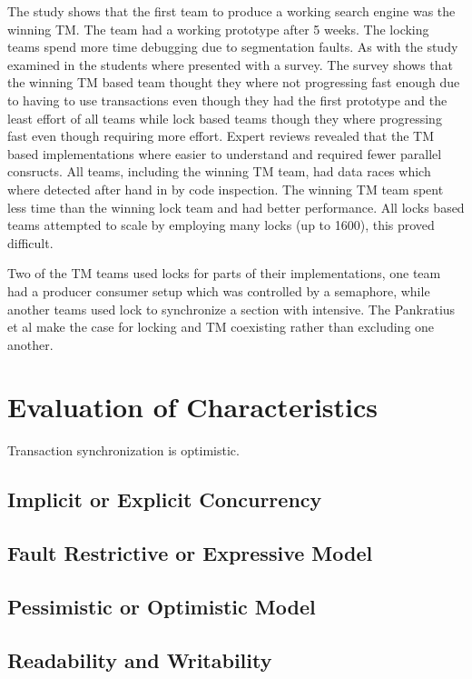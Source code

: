 The study shows that the first team to produce a working search engine was the winning \ac{TM}\cite[p. 6]{pankratius2009does}. The team had a working prototype after 5 weeks.   The locking teams spend more time debugging due to segmentation faults\cite[p. 6]{pankratius2009does}. As with the study examined in  the students where presented with a survey. The survey shows that the  winning \ac{TM} based team thought they where not progressing fast enough due to having to use transactions even though they had the first prototype and the least effort of all teams while lock based teams though they where progressing fast even though requiring more effort\cite[p. 6]{pankratius2009does}. Expert reviews revealed that the \ac{TM} based implementations where easier to understand and required fewer parallel consructs\cite[p. 6]{pankratius2009does}. All teams, including the winning \ac{TM} team, had data races which where detected after hand in by code inspection\cite[p. 6]{pankratius2009does}. The winning \ac{TM} team spent less time than the winning lock team and had better performance\cite[p. 23]{pankratius2009does}. All locks based teams attempted to scale by employing many locks (up to 1600),  this proved difficult\cite[p. 23]{pankratius2009does}.

Two of the \ac{TM} teams used locks for parts of their implementations, one team had a producer consumer setup which was controlled by a semaphore, while another teams used lock to synchronize a section with intensive\cite[p. 5]{pankratius2009does}. The Pankratius et al make the case for locking and \ac{TM} coexisting rather than excluding one another.

\section{Evaluation of Characteristics}

Transaction synchronization is optimistic\cite[p. 1]{guerraoui2005toward}.

\label{sec:stm_eval}
\subsection{Implicit or Explicit Concurrency}
\subsection{Fault Restrictive or Expressive Model}
\subsection{Pessimistic or Optimistic Model}
\subsection{Readability and Writability}
\worksheetend